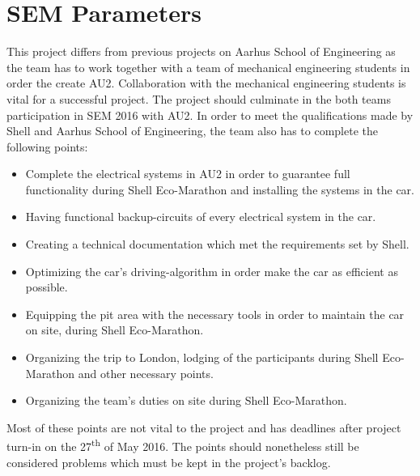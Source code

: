 \section{SEM Parameters }
This project differs from previous projects on Aarhus School of Engineering as the team has to work together with a team of mechanical engineering students in order the create AU2. Collaboration with the mechanical engineering students is vital for a successful project. The project should culminate in the both teams participation in SEM 2016 with AU2. In order to meet the qualifications made by Shell and Aarhus School of Engineering, the team also has to complete the following points:
\begin{itemize}
	\item Complete the electrical systems in AU2 in order to guarantee full functionality during Shell Eco-Marathon and installing the systems in the car.
	\item Having functional backup-circuits of every electrical system in the car.
	\item Creating a technical documentation which met the requirements set by Shell.
	\item Optimizing the car's driving-algorithm in order make the car as efficient as possible.
	\item Equipping the pit area with the necessary tools in order to maintain the car on site, during Shell Eco-Marathon.
	\item Organizing the trip to London, lodging of the participants during Shell Eco-Marathon and other necessary points.
	\item Organizing the team's duties on site during Shell Eco-Marathon.
\end{itemize}
Most of these points are not vital to the project and has deadlines after project turn-in on the 27\textsuperscript{th} of May 2016. The points should nonetheless still be considered problems which must be kept in the project's backlog.